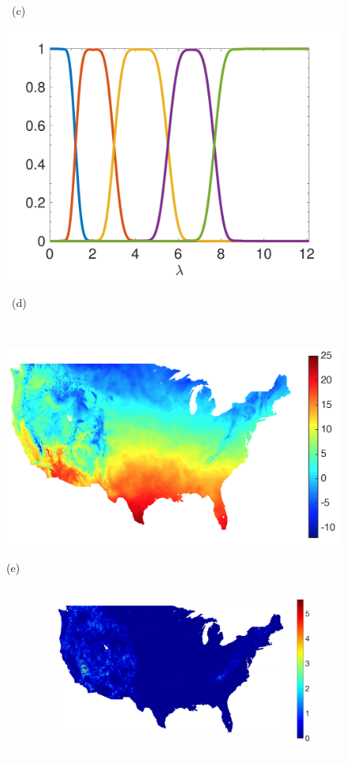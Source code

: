 \documentclass[journal, 10pt]{IEEEtran}
\begin{document}
\begin{figure}[tb]
\begin{minipage}[m]{0.24\linewidth}
\centerline{~\small{(c)}}
\end{minipage} 
\begin{minipage}[m]{0.24\linewidth}
\centerline{\includegraphics[width=.9\linewidth]{fig_temp_fb}}
\centerline{~\small{(d)}}
\end{minipage} \medskip \\
\begin{minipage}[m]{0.24\linewidth}
\centerline{\includegraphics[width=.9\linewidth]{fig_temp_signal}}
\centerline{\small{(e)}}
\end{minipage}
\begin{minipage}[m]{0.24\linewidth}
\centerline{\includegraphics[width=.9\linewidth]{fig_temp_band2_coeffs}}

\end{minipage}
\end{figure}
\end{document}
